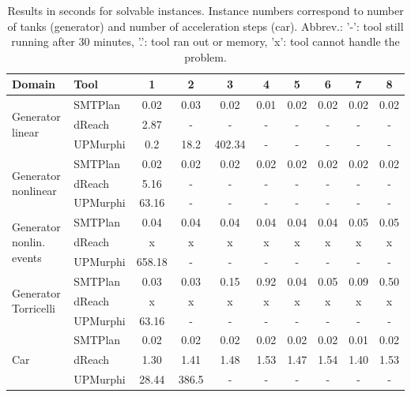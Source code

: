 \begin{table}[ht]
\centering
\def\arraystretch{1.2}
\begin{tabular}{|p{6em}|l|cccccccc|}
\hline
Domain         & Tool      & 1    & 2    & 3    & 4    & 5    & 6    & 7    & 8     \\
\hline
\multirow{3}{*}{\parbox{6em}{Generator linear}}
               & SMTPlan  & 0.02  & 0.03 & 0.02   & 0.01  & 0.02 & 0.02 & 0.02 & 0.02  \\
               & dReach    & 2.87  & -    & -      & -     & -    & -    & -    & -     \\
               & UPMurphi  & 0.2  & 18.2 & 402.34  & -     & -    & -    & -    & -     \\ %
\hline \hline
\multirow{3}{*}{\parbox{6em}{Generator nonlinear}}
               & SMTPlan  & 0.02  & 0.02 & 0.02   & 0.02  & 0.02  & 0.02  & 0.02    & 0.02   \\
               & dReach    & 5.16  & -    & -      & -     & -     & -     & -       & -      \\
               & UPMurphi  & 63.16 & -    & -      & -     & -     & -     & -       & -      \\
\hline \hline
\multirow{3}{*}{\parbox{6em}{Generator nonlin. events}}
               & SMTPlan  & 0.04 & 0.04 & 0.04 & 0.04  & 0.04 & 0.04 & 0.05 & 0.05  \\
               & dReach    & x    & x    & x    & x     & x    & x    & x    & x     \\
               & UPMurphi  & 658.18 & -    & -    & -     & -    & -    & -    & -     \\
\hline \hline
\multirow{3}{*}{\parbox{6em}{Generator Torricelli}}
               & SMTPlan  & 0.03  & 0.03 & 0.15 & 0.92  & 0.04 & 0.05 & 0.09 & 0.50  \\
               & dReach    & x     & x    & x    & x     & x    & x    & x    & x     \\
               & UPMurphi  & 63.16 & -    & -    & -     & -    & -    & -    & -     \\
\hline \hline
\multirow{3}{*}{\parbox{6em}{Car}}
               & SMTPlan  & 0.02  & 0.02  & 0.02 & 0.02  & 0.02 & 0.02 & 0.01 & 0.02  \\
               & dReach    & 1.30  & 1.41  & 1.48 & 1.53  & 1.47 & 1.54 & 1.40 & 1.53  \\
               & UPMurphi  & 28.44 & 386.5 & -    & -     & -    & -    & -    & -     \\ %
\hline
\end{tabular}
\caption{Results in seconds for solvable instances. Instance numbers correspond to number of tanks (generator) and number of acceleration steps (car). Abbrev.: ’-’: tool still running after 30 minutes, '.': tool ran out or memory, ’x’: tool cannot handle the problem.}
\label{tab:solvable}
\end{table}

